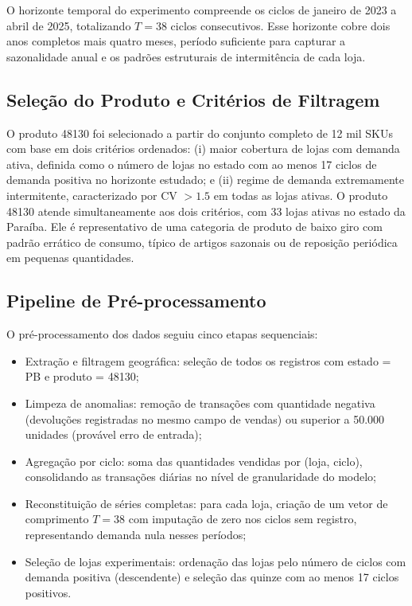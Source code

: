 \documentclass[a4paper,11pt]{article}
\begin{document}
O horizonte temporal do experimento compreende os ciclos de
janeiro de 2023 a abril de 2025, totalizando $T = 38$ ciclos
consecutivos. Esse horizonte cobre dois anos completos mais quatro
meses, período suficiente para capturar a sazonalidade anual e os
padrões estruturais de intermitência de cada loja.

\subsection{Seleção do Produto e Critérios de Filtragem}

O produto 48130 foi selecionado a partir do conjunto completo de
12 mil SKUs com base em dois critérios ordenados: (i) maior
cobertura de lojas com demanda ativa, definida como o número de
lojas no estado com ao menos 17 ciclos de demanda positiva no
horizonte estudado; e (ii) regime de demanda extremamente
intermitente, caracterizado por CV $> 1.5$ em todas as lojas
ativas. O produto 48130 atende simultaneamente aos dois critérios,
com 33 lojas ativas no estado da Paraíba. Ele é representativo de
uma categoria de produto de baixo giro com padrão errático de
consumo, típico de artigos sazonais ou de reposição periódica em
pequenas quantidades.

\subsection{Pipeline de Pré-processamento}

O pré-processamento dos dados seguiu cinco etapas sequenciais:

\begin{itemize}
  \item Extração e filtragem geográfica: seleção de todos
    os registros com estado = PB e produto = 48130;
  \item Limpeza de anomalias: remoção de transações com
    quantidade negativa (devoluções registradas no mesmo campo de
    vendas) ou superior a 50.000 unidades (provável erro de entrada);
  \item Agregação por ciclo: soma das quantidades vendidas por
    (loja, ciclo), consolidando as transações diárias no
    nível de granularidade do modelo;
  \item Reconstituição de séries completas: para cada loja,
    criação de um vetor de comprimento $T = 38$ com imputação de zero
    nos ciclos sem registro, representando demanda nula nesses períodos;
  \item Seleção de lojas experimentais: ordenação das lojas
    pelo número de ciclos com demanda positiva (descendente) e
    seleção das quinze com ao menos 17 ciclos positivos.
\end{itemize}
\end{document}
